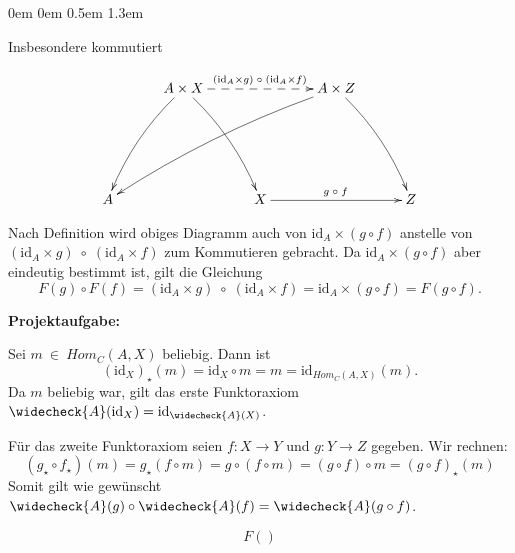\documentclass[a4paper,ngerman]{scrartcl}
\theoremstyle{definition}
\theoremstyle{plain}
\theoremstyle{remark}
\newcommand{\id}{\mathrm{id}}
\begin{document}
\begin{list}{}{0em \leftmargin0em \itemindent0.5em \itemsep 1.3em}
\pagebreak

Insbesondere kommutiert

\[ \xymatrix@=7ex{
  & A \times X \ar@/_/[ldd] \ar@/^/[rdd] \ar@{-->}[rr]^{(\id_A \times g)\;\circ\;(\id_A \times f)} && A \times Z \ar@/_/[llldd] \ar@/^/[rdd]\\
  \\
  A && X \ar[rr]^{g\;\circ\;f} && Z
} \]

Nach Definition wird obiges Diagramm auch von $\id_A \times (g \circ f)$ anstelle von $(\id_A \times g)\;\circ\;(\id_A \times f)$ zum Kommutieren gebracht. Da $\id_A \times (g \circ f)$ aber eindeutig bestimmt ist, gilt die Gleichung
\[F(g) \circ F(f) = (\id_A \times g)\;\circ\;(\id_A \times f) = \id_A \times (g \circ f) = F(g \circ f). \]

\item[\textbf{Projektaufgabe:}]\mbox{}

Sei $m~\in~Hom_C(A, X)$ beliebig. Dann ist
\[ (\id_X)_\star(m) = \id_X \circ m = m = \id_{Hom_C(A, X)}(m). \]
Da $m$ beliebig war, gilt das erste Funktoraxiom $\widecheck{A}(\id_X) = \id_{\widecheck{A}(X)}$.

Für das zweite Funktoraxiom seien $f:X \to Y$ und $g:Y \to Z$ gegeben. Wir rechnen:
\[ (g_\star \circ f_\star)(m) = g_\star(f \circ m) = g \circ (f \circ m) = (g \circ f) \circ m = (g \circ f)_\star(m)\]
Somit gilt wie gewünscht $\widecheck{A}(g) \circ \widecheck{A}(f) = \widecheck{A}(g \circ f)$.


\[ F() \]

\end{list}
\end{document}
